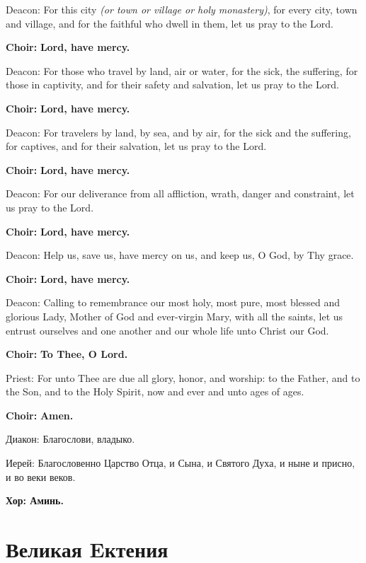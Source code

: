 \documentclass[12pt,a4paper,titlepage]{report}
\begin{document}
\begin{paracol}[1]{2}
  Deacon: For this city \textit{(or town or village or holy monastery)}, for every city, town and village, and for the faithful who dwell in them, let us pray to the Lord.

  \textbf{Choir:} \textbf{Lord, have mercy.}

  Deacon: For those who travel by land, air or water, for the sick, the suffering, for those in captivity, and for their safety and salvation, let us pray to the Lord.

  \textbf{Choir:} \textbf{Lord, have mercy.}

  Deacon: For travelers by land, by sea, and by air, for the sick and the suffering, for captives, and for their salvation, let us pray to the Lord.

  \textbf{Choir:} \textbf{Lord, have mercy.}

  Deacon: For our deliverance from all affliction, wrath, danger and constraint, let us pray to the Lord.

  \textbf{Choir:} \textbf{Lord, have mercy.}

  Deacon: Help us, save us, have mercy on us, and keep us, O God, by Thy grace.

  \textbf{Choir:} \textbf{Lord, have mercy.}

  Deacon: Calling to remembrance our most holy, most pure, most blessed and glorious Lady, Mother of God and ever-virgin Mary, with all the saints, let us entrust ourselves and one another and our whole life unto Christ our God.

  \textbf{Choir:} \textbf{To Thee, O Lord.}

  Priest: For unto Thee are due all glory, honor, and worship: to the Father, and to the Son, and to the Holy Spirit, now and ever and unto ages of ages.

  \textbf{Choir:} \textbf{Amen.}

  \switchcolumn[1]

  Диакон: Благослови, владыко.

  Иерей: Благословенно Царство Отца, и Сына, и Святого Духа, и ныне и присно, и во веки веков.

  \textbf{Хор: Аминь.}

  \section*{Великая Eктения}


\end{paracol}
\end{document}
